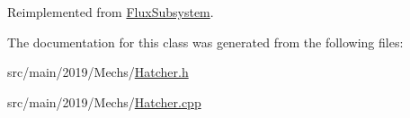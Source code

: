 Reimplemented from \hyperlink{classFluxSubsystem_a327d76affc60699bfa62563e364e42f5}{Flux\+Subsystem}.



The documentation for this class was generated from the following files\+:\begin{DoxyCompactItemize}
\item 
src/main/2019/\+Mechs/\hyperlink{Hatcher_8h}{Hatcher.\+h}\item 
src/main/2019/\+Mechs/\hyperlink{Hatcher_8cpp}{Hatcher.\+cpp}\end{DoxyCompactItemize}
